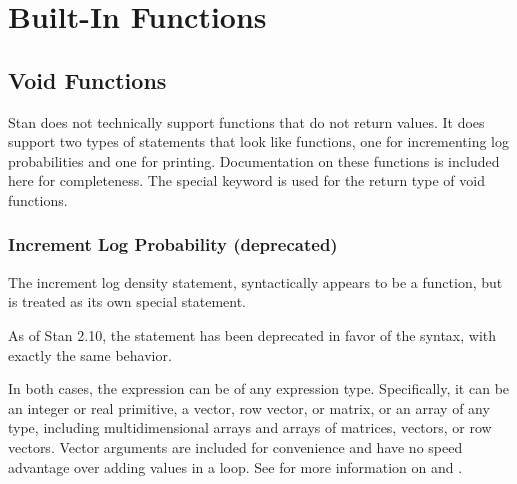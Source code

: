 \part{Built-In Functions}\label{built-in-functions.part}

\chapter{Void Functions}

Stan does not technically support functions that do not return values.
It does support two types of statements that look like functions, one
for incrementing log probabilities and one for printing.
Documentation on these functions is included here for completeness.
The special keyword  is used for the return type of void
functions. 

\section{Increment Log Probability (deprecated)}

The increment log density statement, 
syntactically appears to be a function, but is treated as its own
special statement.
\begin{description}
\end{description}
%
As of Stan 2.10, the  statement has been
deprecated in favor of the  syntax, with exactly the
same behavior.
%
\begin{description}
\end{description}
%

In both cases, the expression  can be of any expression type.
Specifically, it can be an integer or real primitive, a vector, row
vector, or matrix, or an array of any type, including multidimensional
arrays and arrays of matrices, vectors, or row vectors.  Vector
arguments are included for convenience and have no speed advantage
over adding values in a loop.  See  for
more information on  and .

